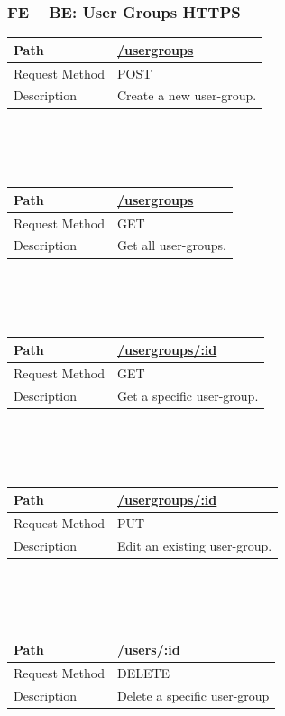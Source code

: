 \documentclass{scrreprt}
\begin{document}
\subsubsection{FE -- BE: User Groups HTTPS}
\begin{tabularx}{12cm}{l|l}
	Path & \url{/usergroups} \\\hline
	Request Method & POST \\\hline
	Description & Create a new user-group.
\end{tabularx}
\\
\\ \\
\begin{tabularx}{12cm}{l|l}
	Path & \url{/usergroups} \\\hline
	Request Method & GET \\\hline
	Description & Get all user-groups.
\end{tabularx}
\\
\\ \\
\begin{tabularx}{12cm}{l|l}
	Path & \url{/usergroups/:id} \\\hline
	Request Method & GET \\\hline
	Description & Get a specific user-group.
\end{tabularx}
\\
\\ \\
\begin{tabularx}{12cm}{l|l}
	Path & \url{/usergroups/:id} \\\hline
	Request Method & PUT  \\\hline
	Description & Edit an existing user-group.
\end{tabularx}
\\
\\ \\
\begin{tabularx}{12cm}{l|l}
	Path & \url{/users/:id} \\\hline
	Request Method & DELETE \\\hline
	Description & Delete a specific user-group
\end{tabularx}
\\
\\ \\
\end{document}
